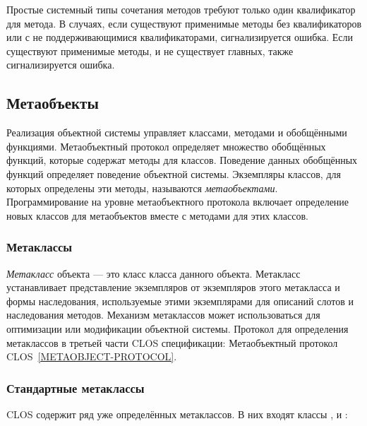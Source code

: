 Простые системный типы сочетания методов требуют только один квалификатор для
метода. В случаях, если существуют применимые методы без квалификаторов или с
не поддерживающимися квалификаторами, сигнализируется ошибка. Если существуют
применимые  методы, и не существует главных, также сигнализируется
ошибка.

\subsection{Метаобъекты}

Реализация объектной системы управляет классами, методами и обобщёнными
функциями. Метаобъектный протокол определяет множество обобщённых функций,
которые содержат методы для классов. Поведение данных обобщённых функций
определяет поведение объектной системы. Экземпляры классов, для которых
определены эти методы, называются \emph{метаобъектами}. Программирование на
уровне метаобъектного протокола включает определение новых классов для
метаобъектов вместе с методами для этих классов.

\subsubsection{Метаклассы}

\emph{Метакласс} объекта --- это класс класса данного объекта. Метакласс
устанавливает представление экземпляров от экземпляров этого метакласса и формы
наследования, используемые этими экземплярами для описаний слотов и наследования
методов. Механизм метаклассов может использоваться для оптимизации или
модификации объектной системы. Протокол для определения метаклассов в третьей
части CLOS спецификации: Метаобъектный протокол CLOS~\ref{METAOBJECT-PROTOCOL}.

\subsubsection{Стандартные метаклассы}

CLOS содержит ряд уже определённых метаклассов. В них входят классы
,  и :


